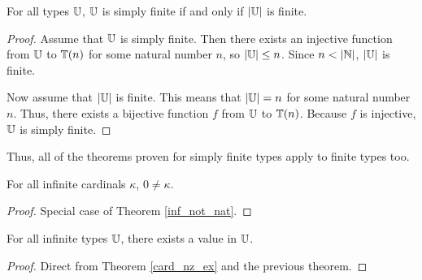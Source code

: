 \documentclass[../../math.tex]{subfiles}
\begin{document}
\begin{theorem} \label{simple_finite_finite}
    For all types $\mathbb{U}$, $\mathbb{U}$ is simply finite if and only if $|\mathbb{U}|$ is finite.
\end{theorem}
\begin{proof}
    Assume that $\mathbb{U}$ is simply finite.  Then there exists an injective function
    from $\mathbb{U}$ to $\mathbb{T}(n)$ for some natural number $n$, so $|\mathbb{U}| \leq n$.  Since
    $n < |\mathbb{N}|$, $|\mathbb{U}|$ is finite.

    Now assume that $|\mathbb{U}|$ is finite.  This means that $|\mathbb{U}| = n$ for some
    natural number $n$.  Thus, there exists a bijective function $f$ from $\mathbb{U}$
    to $\mathbb{T}(n)$.  Because $f$ is injective, $\mathbb{U}$ is simply finite.
\end{proof}

Thus, all of the theorems proven for simply finite types apply to finite types
too.

\begin{theorem} \label{infinite_nz}
    For all infinite cardinals $\kappa$, $0 \neq \kappa$.
\end{theorem}
\begin{proof}
    Special case of Theorem \ref{inf_not_nat}.
\end{proof}

\begin{theorem} \label{infinite_ex}
    For all infinite types $\mathbb{U}$, there exists a value in $\mathbb{U}$.
\end{theorem}
\begin{proof}
    Direct from Theorem \ref{card_nz_ex} and the previous theorem.
\end{proof}
\end{document}
